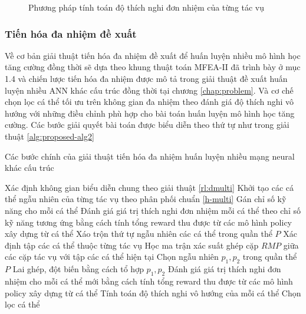 \begin{figure}[ht]
    \centering
    \caption{Phương pháp tính toán độ thích nghi đơn nhiệm của từng tác vụ}
    \label{fig:problem:policy-ea}
\end{figure}


\subsubsection{Tiến hóa đa nhiệm đề xuất}
Về cơ bản giải thuật tiến hóa đa nhiệm đề xuất để huấn luyện nhiều mô hình học tăng cường đồng thời sẽ dựa theo khung thuật toán MFEA-II đã trình bày ở mục 1.4 và chiến lược tiến hóa đa nhiệm được mô tả trong giải thuật đề xuất huấn luyện nhiều ANN khác cấu trúc đồng thời tại chương \ref{chap:problem}.
Và cơ chế chọn lọc cá thể tối ưu trên không gian đa nhiệm theo đánh giá độ thích nghi vô hướng với những điều chỉnh phù hợp cho bài toán huấn luyện mô hình học tăng cường. Các bước giải quyết bài toán được biểu diễn theo thứ tự như trong giải thuật \ref{alg:proposed-alg2}
\begin{algorithm} [h!]
    \caption{Các bước chính của giải thuật tiến hóa đa nhiệm huấn luyện nhiều mạng neural khác cấu trúc}
    \begin{algorithmic}[1]
        \State Xác định không gian biểu diễn chung theo giải thuật \ref{rl:dmulti}
        \State Khởi tạo các cá thể ngẫu nhiên của từng tác vụ theo phân phối chuẩn \ref{h-multi}
        \State Gán chỉ số kỹ năng cho mỗi cá thể
        \State Đánh giá giá trị thích nghi đơn nhiệm mỗi cá thể theo chỉ số kỹ năng tương ứng bằng cách tính tổng reward thu được từ các mô hình policy xây dựng từ cá thể
            \State Xáo trộn thứ tự ngẫu nhiên các cá thể trong quần thể $P$
            \State Xác định tập các cá thể thuộc từng tác vụ
            \State Học ma trận xác suất ghép cặp $RMP$ giữa các cặp tác vụ với tập các cá thể hiện tại
                \State Chọn ngẫu nhiên $p_1, p_2$ trong quần thể $P$
                \State Lai ghép, đột biến bằng cách tổ hợp $p_1, p_2$
                \State Đánh giá giá trị thích nghi đơn nhiệm cho mỗi cá thể mới bằng cách tính tổng reward thu được từ các mô hình policy xây dựng từ cá thể
                \State Tính toán độ thích nghi vô hướng của mỗi cá thể
                \State Chọn lọc cá thể
            \EndFor
        \EndFor
    \end{algorithmic}
    \label{alg:proposed-alg2}
\end{algorithm}

